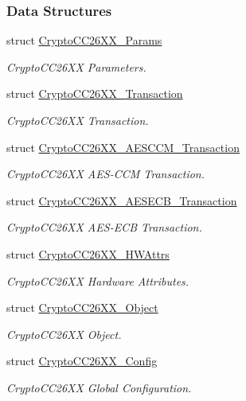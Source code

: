 \subsubsection*{Data Structures}
\begin{DoxyCompactItemize}
\item 
struct \hyperlink{struct_crypto_c_c26_x_x___params}{Crypto\+C\+C26\+X\+X\+\_\+\+Params}
\begin{DoxyCompactList}\small\item\em Crypto\+C\+C26\+X\+X Parameters. \end{DoxyCompactList}\item 
struct \hyperlink{struct_crypto_c_c26_x_x___transaction}{Crypto\+C\+C26\+X\+X\+\_\+\+Transaction}
\begin{DoxyCompactList}\small\item\em Crypto\+C\+C26\+X\+X Transaction. \end{DoxyCompactList}\item 
struct \hyperlink{struct_crypto_c_c26_x_x___a_e_s_c_c_m___transaction}{Crypto\+C\+C26\+X\+X\+\_\+\+A\+E\+S\+C\+C\+M\+\_\+\+Transaction}
\begin{DoxyCompactList}\small\item\em Crypto\+C\+C26\+X\+X A\+E\+S-\/\+C\+C\+M Transaction. \end{DoxyCompactList}\item 
struct \hyperlink{struct_crypto_c_c26_x_x___a_e_s_e_c_b___transaction}{Crypto\+C\+C26\+X\+X\+\_\+\+A\+E\+S\+E\+C\+B\+\_\+\+Transaction}
\begin{DoxyCompactList}\small\item\em Crypto\+C\+C26\+X\+X A\+E\+S-\/\+E\+C\+B Transaction. \end{DoxyCompactList}\item 
struct \hyperlink{struct_crypto_c_c26_x_x___h_w_attrs}{Crypto\+C\+C26\+X\+X\+\_\+\+H\+W\+Attrs}
\begin{DoxyCompactList}\small\item\em Crypto\+C\+C26\+X\+X Hardware Attributes. \end{DoxyCompactList}\item 
struct \hyperlink{struct_crypto_c_c26_x_x___object}{Crypto\+C\+C26\+X\+X\+\_\+\+Object}
\begin{DoxyCompactList}\small\item\em Crypto\+C\+C26\+X\+X Object. \end{DoxyCompactList}\item 
struct \hyperlink{struct_crypto_c_c26_x_x___config}{Crypto\+C\+C26\+X\+X\+\_\+\+Config}
\begin{DoxyCompactList}\small\item\em Crypto\+C\+C26\+X\+X Global Configuration. \end{DoxyCompactList}\end{DoxyCompactItemize}
